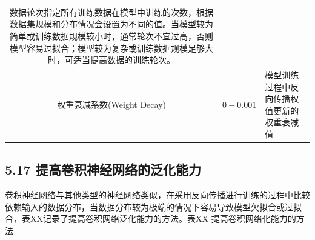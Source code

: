 \begin{longtable}[]{@{}ccl@{}}
\begin{minipage}[t]{0.08\columnwidth}
数据轮次指定所有训练数据在模型中训练的次数，根据数据集规模和分布情况会设置为不同的值。当模型较为简单或训练数据规模较小时，通常轮次不宜过高，否则模型容易过拟合；模型较为复杂或训练数据规模足够大时，可适当提高数据的训练轮次。\strut
\end{minipage}\tabularnewline
\begin{minipage}[t]{0.09\columnwidth}\centering\strut
权重衰减系数(Weight Decay)\strut
\end{minipage} & \begin{minipage}[t]{0.10\columnwidth}\centering\strut
\(0-0.001\)\strut
\end{minipage} & \begin{minipage}[t]{0.08\columnwidth}\raggedright\strut
模型训练过程中反向传播权值更新的权重衰减值\strut
\end{minipage}\tabularnewline
\bottomrule
\end{longtable}

\subsection{5.17
提高卷积神经网络的泛化能力}\label{ux63d0ux9ad8ux5377ux79efux795eux7ecfux7f51ux7edcux7684ux6cdbux5316ux80fdux529b}

​
卷积神经网络与其他类型的神经网络类似，在采用反向传播进行训练的过程中比较依赖输入的数据分布，当数据分布较为极端的情况下容易导致模型欠拟合或过拟合，表XX记录了提高卷积网络泛化能力的方法。
​ 表XX 提高卷积网络化能力的方法

